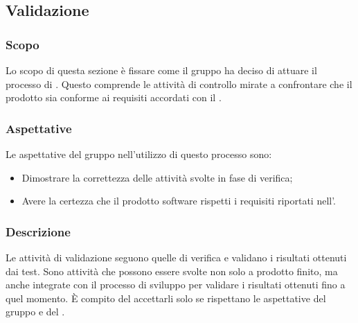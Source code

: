 \subsection{Validazione}
\subsubsection{Scopo}
Lo scopo di questa sezione è fissare come il gruppo ha deciso di attuare il processo di . Questo comprende le attività di controllo mirate a confrontare che il prodotto sia conforme ai requisiti accordati con il .

\subsubsection{Aspettative}
Le aspettative del gruppo \Gruppo{} nell'utilizzo di questo processo sono:
\begin{itemize}
	\item Dimostrare la correttezza delle attività svolte in fase di verifica; 
	\item Avere la certezza che il prodotto software rispetti i requisiti riportati nell'\AdRv.
\end{itemize}

\subsubsection{Descrizione}
Le attività di validazione seguono quelle di verifica e validano i risultati ottenuti dai test. Sono attività che possono essere svolte non solo a prodotto finito, ma anche integrate con il processo di sviluppo per validare i risultati ottenuti fino a quel momento. È compito del \Responsabile{} accettarli solo se rispettano le aspettative del gruppo e del . 


